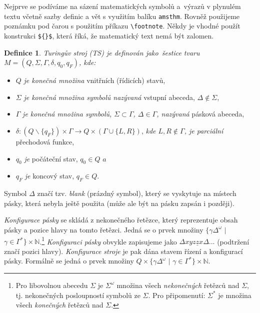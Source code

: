 \documentclass[11pt, twocolumn, a4paper]{article}
\newtheorem{theorem}{Definice}
\begin{document}
Nejprve se podíváme na sázení matematických symbolů
a~výrazů v plynulém textu včetně sazby definic a vět s využitím
balíku \texttt{amsthm}. Rovněž použijeme poznámku pod
čarou s použitím příkazu \verb|\footnote|. Někdy je vhodné
použít konstrukci \verb!${}$!, která říká, že matematický text
nemá být zalomen.
\label{Definice 1}
\begin{theorem}
\emph{Turingův stroj} (TS) je definován jako~šestice
tvaru $M = (Q, \Sigma, \Gamma, \delta, q_0, q_F )$, kde:
\end{theorem}
\begin{itemize}
\item $Q$ \textit{je konečná množina} vnitřních (řídicích) stavů,

\item $\Sigma$ \textit{je konečná množina symbolů nazývaná} vstupní
abeceda, $\Delta \notin \Sigma$,

\item $\Gamma$ \textit{je konečná množina symbolů, $\Sigma \subset \Gamma$, $\Delta \in \Gamma$,
nazývaná} pásková abeceda,

\item $\delta:(Q\backslash\{q_F \})\times \Gamma \rightarrow Q\times(\Gamma\cup\{L, R\})$, \textit{kde $L, R \notin \Gamma$, je parciální} přechodová funkce,

\item  $q_0$ \textit{je} počáteční stav, $q_0 \in Q$ $a$

\item $q_F$ \textit{je} koncový stav, $q_F \in Q$.
\end{itemize}

Symbol $\Delta$ značí tzv. \textit{blank} (prázdný symbol), který se vyskytuje na místech pásky, která nebyla ještě použita
(může ale být na pásku zapsán i později).

\textit{Konfigurace pásky} se skládá z nekonečného řetězce,
který reprezentuje obsah pásky a pozice hlavy na tomto
řetězci. Jedná se o prvek množiny $\{\gamma\Delta^\omega $ $|$ $ \gamma\in\Gamma^\ast\} \times \mathbb{N}$.\footnote{Pro libovolnou abecedu $\Sigma$ je $\Sigma^\omega$ množina všech \textit{nekonečných} řetězců nad $\Sigma$, tj. nekonečných posloupností symbolů ze $\Sigma$. Pro připo\-menutí: $\Sigma^\ast$ je množina všech \textit{konečných} řetězců nad $\Sigma$.} \textit{Konfiguraci pásky} obvykle zapisujeme jako $\Delta xyz\underline{z}x\Delta...$ (podtržení značí pozici hlavy). \textit{Konfigurace stroje} je pak dána stavem řízení a konfigurací pásky. Formálně se jedná o prvek množiny $Q \times \{\gamma\Delta^\omega$ $|$ $ \gamma \in \Gamma^\ast\} \times\mathbb{N}$.
\end{document}
